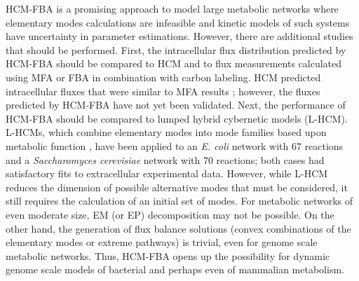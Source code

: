 \documentclass[10pt,twocolumn,twoside,final]{IEEEtran}
\begin{document}
HCM-FBA is a promising approach to model large metabolic networks where elementary modes calculations are infeasible and kinetic models of such systems have uncertainty in parameter estimations.
However, there are additional studies that should be performed.
First, the intracellular flux distribution predicted by HCM-FBA should be compared to HCM and to flux measurements calculated using MFA or FBA in combination with carbon labeling.
HCM predicted intracellular fluxes that were similar to MFA results \cite{2008_kim_varner_ramkrishna_BiotechProg}; however, the fluxes predicted by HCM-FBA have not yet been validated.
Next, the performance of HCM-FBA should be compared to lumped hybrid cybernetic models (L-HCM).
L-HCMs, which combine elementary modes into mode families based upon metabolic function \cite{2010_song,Song:2011aa},
have been applied to an \textit{E. coli} network with 67 reactions and a \textit{Saccharomyces cerevisiae} network with 70 reactions;
both cases had satisfactory fits to extracellular experimental data.
However, while L-HCM reduces the dimension of possible alternative modes that must be considered, it still requires the calculation of an initial set of modes.
For metabolic networks of even moderate size, EM (or EP) decomposition may not be possible.
On the other hand, the generation of flux balance solutions (convex combinations of the elementary modes or extreme pathways) is trivial, even for genome scale metabolic networks.
Thus, HCM-FBA opens up the possibility for dynamic genome scale models of bacterial and perhaps even of mammalian metabolism.
\end{document}
